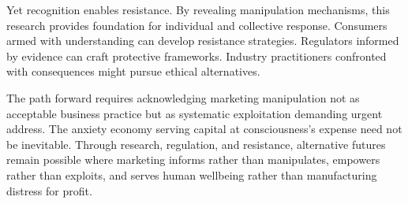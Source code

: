 Yet recognition enables resistance. By revealing manipulation mechanisms, this research provides foundation for individual and collective response. Consumers armed with understanding can develop resistance strategies. Regulators informed by evidence can craft protective frameworks. Industry practitioners confronted with consequences might pursue ethical alternatives.

The path forward requires acknowledging marketing manipulation not as acceptable business practice but as systematic exploitation demanding urgent address. The anxiety economy serving capital at consciousness's expense need not be inevitable. Through research, regulation, and resistance, alternative futures remain possible where marketing informs rather than manipulates, empowers rather than exploits, and serves human wellbeing rather than manufacturing distress for profit.